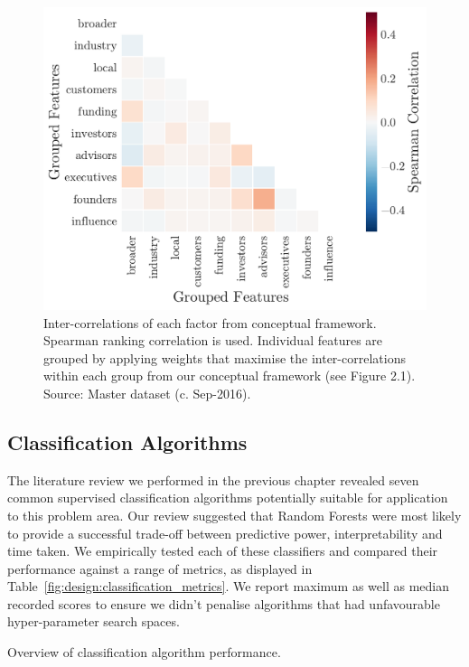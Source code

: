 \documentclass[../thesis/thesis.tex]{subfiles}
\begin{document}
\begin{figure}[!htb]
    \centering
    \includegraphics[width=\textwidth]{../figures/design/grouped_heatmap}
    \caption[Inter-correlations of factors from framework]{Inter-correlations of each factor from conceptual framework. Spearman ranking correlation is used. Individual features are grouped by applying weights that maximise the inter-correlations within each group from our conceptual framework (see Figure 2.1). Source: Master dataset (c. Sep-2016).}
    \label{fig:design:grouped_heatmap}
\end{figure}

\subsection{Classification Algorithms}

The literature review we performed in the previous chapter revealed seven common supervised classification algorithms potentially suitable for application to this problem area. Our review suggested that Random Forests were most likely to provide a successful trade-off between predictive power, interpretability and time taken. We empirically tested each of these classifiers and compared their performance against a range of metrics, as displayed in Table~\ref{fig:design:classification_metrics}. We report maximum as well as median recorded scores to ensure we didn't penalise algorithms that had unfavourable hyper-parameter search spaces.

\begin{table}[!htb]
    \centering
    \scalebox{0.8}{}
    \caption[Overview of classification algorithm performance]{Overview of classification algorithm performance.}
    \label{fig:design:classification_metrics}
\end{table}
\end{document}
